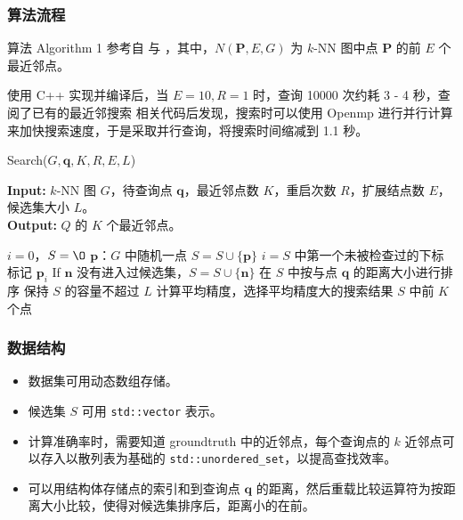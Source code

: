 \documentclass{article}
\newcommand{\tb}[1]{\textbf{#1}}
\begin{document}
\subsubsection*{算法流程}
算法 Algorithm 1 参考自 \cite{ref1} 与 \cite{ref2}，其中，$N(\tb P, E, G)$ 为 $k$-NN 图中点 $\tb P$ 的前 $E$ 个最近邻点。

使用 C++ 实现并编译后，当 $E = 10, R = 1$ 时，查询 10000 次约耗 3 - 4 秒，查阅了已有的最近邻搜索 \cite{ref3} 相关代码后发现，搜索时可以使用 Openmp 进行并行计算来加快搜索速度，于是采取并行查询，将搜索时间缩减到 1.1 秒。

\begin{algorithm}[h]
\small
\caption{Search($G, \tb q, K, R, E, L$)} %
\hspace*{0.02in} {\bf Input:} %
	$k$-NN 图 $G$，待查询点 $\tb q$，最近邻点数 $K$，重启次数 $R$，扩展结点数 $E$，候选集大小 $L$。 \\
\hspace*{0.02in} {\bf Output:} %
	$Q$ 的 $K$ 个最近邻点。
\begin{algorithmic}[1]
		\State $i = 0$，$S = \O$
		\State $\tb p$：$G$ 中随机一点
		\State $S = S \cup \{ \tb p\}$
				\State $i = S$ 中第一个未被检查过的下标
				\State 标记 $ \tb p_i$
				\For{$ \tb n$ in $N(\tb p_i, E, G)$}
						\State If $ \tb n$ 没有进入过候选集，$S = S \cup \{ \tb n\}$
				\EndFor
				\State 在 $S$ 中按与点 $\tb q$ 的距离大小进行排序
				\State 保持 $S$ 的容量不超过 $L$
		\EndWhile
		\State 计算平均精度，选择平均精度大的搜索结果
\EndFor
\State \Return $S$ 中前 $K$ 个点
\end{algorithmic}
\end{algorithm}

\subsubsection*{数据结构}
\begin{itemize}
		\item 数据集可用动态数组存储。
		\item 候选集 $S$ 可用 \verb|std::vector| 表示。
		\item 计算准确率时，需要知道 groundtruth 中的近邻点，每个查询点的 $k$ 近邻点可以存入以散列表为基础的 \verb|std::unordered_set|，以提高查找效率。
		\item 可以用结构体存储点的索引和到查询点 $\tb q$ 的距离，然后重载比较运算符为按距离大小比较，使得对候选集排序后，距离小的在前。
\end{itemize}
\end{document}
